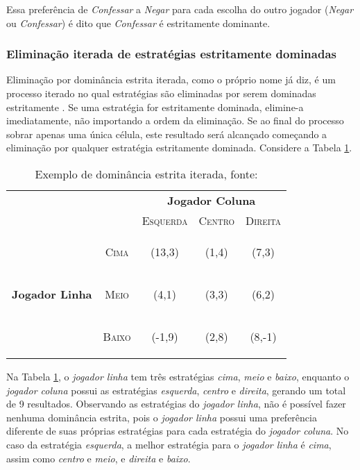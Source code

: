 Essa preferência de \emph{Confessar} a \emph{Negar} para cada escolha do outro jogador (\emph{Negar} ou \emph{Confessar}) é dito que \emph{Confessar} é estritamente dominante.

\subsubsection{Eliminação iterada de estratégias estritamente dominadas}

Eliminação por dominância estrita iterada, como o próprio nome já diz, é um processo iterado no qual estratégias são eliminadas por serem dominadas estritamente \cite{spaniel_2011}. Se uma estratégia for estritamente dominada, elimine-a imediatamente, não importando a ordem da eliminação. Se ao final do processo sobrar apenas uma única célula, este resultado será alcançado começando a eliminação por qualquer estratégia estritamente dominada. Considere a Tabela \ref{tab:dominancia-estrita-iterada}.

\begin{table}[ht]
\centering
\begin{tabular}{|c|c|c|c|c|}
\cline{3-5}
\multicolumn{1}{c}{} &  & \multicolumn{3}{c|}{\textbf{Jogador Coluna}}\tabularnewline
\cline{3-5}
\multicolumn{1}{c}{} &  & \textsc{Esquerda} & \textsc{Centro} & \textsc{Direita}\tabularnewline
\hline
\multirow{3}{*}{\begin{turn}{90}
\textbf{Jogador Linha}
\end{turn}} & \begin{turn}{90}
\textsc{Cima}
\end{turn} & {\Large(13,3)} & {\Large(1,4)} & {\Large(7,3)} \tabularnewline
\cline{2-5}
 & \begin{turn}{90}
\textsc{Meio}
\end{turn} & {\Large(4,1)} & {\Large(3,3)} & {\Large(6,2)} \tabularnewline
\cline{2-5}
 & \begin{turn}{90}
\textsc{Baixo}
\end{turn} &  {\Large(-1,9)} & {\Large(2,8)} & {\Large(8,-1)} \tabularnewline
\hline
\end{tabular}
\caption{Exemplo de dominância estrita iterada, fonte: \cite{spaniel_2011}}
\label{tab:dominancia-estrita-iterada}
\end{table}

Na Tabela \ref{tab:dominancia-estrita-iterada}, o \emph{jogador linha} tem três estratégias \emph{cima}, \emph{meio} e \emph{baixo}, enquanto o \emph{jogador coluna} possui as estratégias \emph{esquerda}, \emph{centro} e \emph{direita}, gerando um total de 9 resultados.
Observando as estratégias do \emph{jogador linha}, não é possível fazer nenhuma dominância estrita, pois o \emph{jogador linha} possui uma preferência diferente de suas próprias estratégias para cada estratégia do \emph{jogador coluna}. No caso da estratégia \emph{esquerda}, a melhor estratégia para o \emph{jogador linha} é \emph{cima}, assim como \emph{centro} e \emph{meio}, e \emph{direita} e \emph{baixo}.

